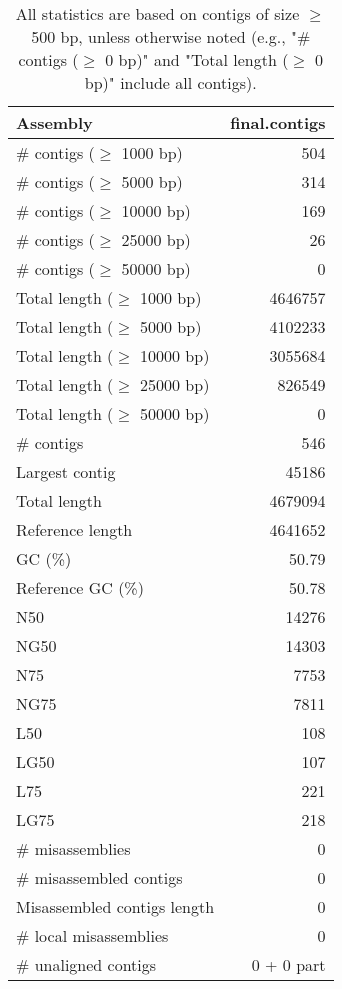 \documentclass[12pt,a4paper]{article}
\begin{document}
\begin{table}[ht]
\begin{center}
\caption{All statistics are based on contigs of size $\geq$ 500 bp, unless otherwise noted (e.g., "\# contigs ($\geq$ 0 bp)" and "Total length ($\geq$ 0 bp)" include all contigs).}
\begin{tabular}{|l*{1}{|r}|}
\hline
Assembly & final.contigs \\ \hline
\# contigs ($\geq$ 1000 bp) & 504 \\ \hline
\# contigs ($\geq$ 5000 bp) & 314 \\ \hline
\# contigs ($\geq$ 10000 bp) & 169 \\ \hline
\# contigs ($\geq$ 25000 bp) & 26 \\ \hline
\# contigs ($\geq$ 50000 bp) & 0 \\ \hline
Total length ($\geq$ 1000 bp) & 4646757 \\ \hline
Total length ($\geq$ 5000 bp) & 4102233 \\ \hline
Total length ($\geq$ 10000 bp) & 3055684 \\ \hline
Total length ($\geq$ 25000 bp) & 826549 \\ \hline
Total length ($\geq$ 50000 bp) & 0 \\ \hline
\# contigs & 546 \\ \hline
Largest contig & 45186 \\ \hline
Total length & 4679094 \\ \hline
Reference length & 4641652 \\ \hline
GC (\%) & 50.79 \\ \hline
Reference GC (\%) & 50.78 \\ \hline
N50 & 14276 \\ \hline
NG50 & 14303 \\ \hline
N75 & 7753 \\ \hline
NG75 & 7811 \\ \hline
L50 & 108 \\ \hline
LG50 & 107 \\ \hline
L75 & 221 \\ \hline
LG75 & 218 \\ \hline
\# misassemblies & 0 \\ \hline
\# misassembled contigs & 0 \\ \hline
Misassembled contigs length & 0 \\ \hline
\# local misassemblies & 0 \\ \hline
\# unaligned contigs & 0 + 0 part \\ \hline

\end{tabular}
\end{center}
\end{table}
\end{document}
